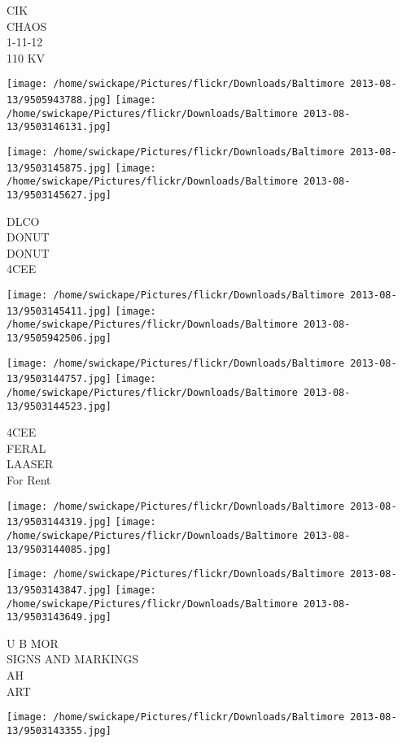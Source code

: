 \documentclass[10pt,letterpaper]{article}
\begin{document}
CIK\\
CHAOS\\
1{-}11{-}12\\
110 KV\\
\pagebreak

\texttt{[image: /home/swickape/Pictures/flickr/Downloads/Baltimore 2013-08-13/9505943788.jpg]}
\texttt{[image: /home/swickape/Pictures/flickr/Downloads/Baltimore 2013-08-13/9503146131.jpg]}

\texttt{[image: /home/swickape/Pictures/flickr/Downloads/Baltimore 2013-08-13/9503145875.jpg]}
\texttt{[image: /home/swickape/Pictures/flickr/Downloads/Baltimore 2013-08-13/9503145627.jpg]}

DLCO\\
DONUT\\
DONUT\\
4CEE\\
\pagebreak

\texttt{[image: /home/swickape/Pictures/flickr/Downloads/Baltimore 2013-08-13/9503145411.jpg]}
\texttt{[image: /home/swickape/Pictures/flickr/Downloads/Baltimore 2013-08-13/9505942506.jpg]}

\texttt{[image: /home/swickape/Pictures/flickr/Downloads/Baltimore 2013-08-13/9503144757.jpg]}
\texttt{[image: /home/swickape/Pictures/flickr/Downloads/Baltimore 2013-08-13/9503144523.jpg]}

4CEE\\
FERAL\\
LAASER\\
For Rent\\
\pagebreak

\texttt{[image: /home/swickape/Pictures/flickr/Downloads/Baltimore 2013-08-13/9503144319.jpg]}
\texttt{[image: /home/swickape/Pictures/flickr/Downloads/Baltimore 2013-08-13/9503144085.jpg]}

\texttt{[image: /home/swickape/Pictures/flickr/Downloads/Baltimore 2013-08-13/9503143847.jpg]}
\texttt{[image: /home/swickape/Pictures/flickr/Downloads/Baltimore 2013-08-13/9503143649.jpg]}

U B MOR\\
SIGNS AND MARKINGS\\
AH\\
ART\\
\pagebreak

\texttt{[image: /home/swickape/Pictures/flickr/Downloads/Baltimore 2013-08-13/9503143355.jpg]}
\end{document}
